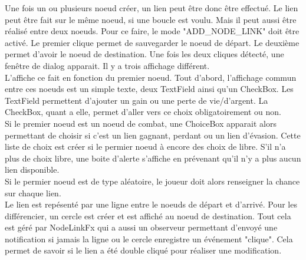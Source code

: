 		Une fois un ou plusieurs noeud créer, un lien peut être donc être effectué. Le lien peut être fait sur le même noeud, si une boucle est voulu. Mais il peut aussi être réalisé entre deux noeuds. Pour ce faire, le mode "ADD_NODE_LINK" doit être activé. Le premier clique permet de sauvegarder le noeud de départ. Le deuxième permet d'avoir le noeud de destination. Une fois les deux cliques détecté, une fenêtre de dialog apparait. Il y a trois affichage différent.\\
		L'affiche ce fait en fonction du premier noeud. Tout d'abord, l'affichage commun entre ces noeuds est un simple texte, deux TextField ainsi qu'un CheckBox. Les TextField permettent d'ajouter un gain ou une perte de vie/d'argent. La CheckBox, quant a elle, permet d'aller vers ce choix obligatoirement ou non.\\
		Si le premier noeud est un noeud de combat, une ChoiceBox apparait alors permettant de choisir si c'est un lien gagnant, perdant ou un lien d'évasion. Cette liste de choix est créer si le permier noeud à encore des choix de libre. S'il n'a plus de choix libre, une boite d'alerte s'affiche en prévenant qu'il n'y a plus aucun lien disponible.\\

		Si le permier noeud est de type aléatoire, le joueur doit alors renseigner la chance sur chaque lien.\\

		Le lien est repésenté par une ligne entre le noeuds de départ et d'arrivé. Pour les différencier, un cercle est créer et est affiché au noeud de destination. Tout cela est géré par NodeLinkFx qui a aussi un observeur permettant d'envoyé une notification si jamais la ligne ou le cercle enregistre un événement "clique". Cela permet de savoir si le lien a été double cliqué pour réaliser une modification.\\

